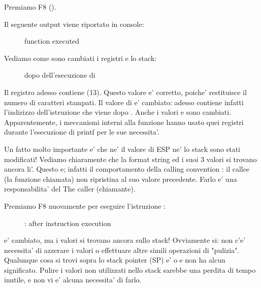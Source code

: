 \clearpage
Premiamo F8 (\stepover).

Il seguente output viene riportato in console:

\begin{figure}[H]
\centering
{}
\caption{\printf function executed}
\end{figure}

Vediamo come sono cambiati i registri e lo stack:

\begin{figure}[H]
\centering
{}
\caption{\olly dopo dell'esecuzione di \printf{}}
\label{fig:printf3_olly_3}
\end{figure}

Il registro \EAX adesso contiene  (13).
Questo valore e' corretto, poiche' \printf restituisce il numero di caratteri stampati. 
Il valore di \EIP e' cambiato: adesso contiene infatti l'indirizzo dell'istruzione che viene dopo .
Anche i valori \ECX e \EDX sono cambiati.
Apparentemente, i meccanismi interni alla funzione \printf hanno usato quei registri durante l'esecuzione di printf per le sue necessita'.

Un fatto molto importante e' che ne' il valore di ESP ne' lo stack sono stati modificati!
Vediamo chiaramente che la format string ed i suoi 3 valori si trovano ancora li'.
Questo e; infatti il comportamento della calling convention : il \gls{callee} (la funzione chiamata) non ripristina
\ESP al suo valore precedente. Farlo e' una responsabilita' del The \gls{caller} (chiamante).

\clearpage
Premiamo F8 nuovamente per eseguire l'istruzione :

\begin{figure}[H]
\centering
{}
\caption{\olly: after  instruction execution}
\label{fig:printf3_olly_4}
\end{figure}

\ESP e' cambiato, ma i valori si trovano ancora sullo stack!
Ovviamente si: non c'e' necessita' di azzerare i valori o effettuare altre simili operazioni di "pulizia".
Qualunque cosa si trovi sopra lo stack pointer (\ac{SP}) e'  o \IT{\garbage{}} e non ha alcun significato.
Pulire i valori non utilizzati nello stack sarebbe una perdita di tempo inutile, e non vi e' alcuna necessita' di farlo.


